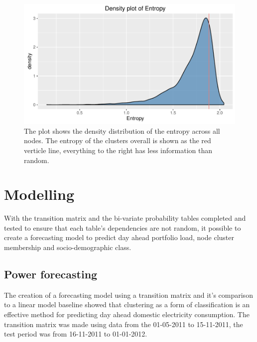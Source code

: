\begin{figure}[ht]
    \centering
    \includegraphics{Figures/Results/stabilitydens}
    \caption[Entropy density]{The plot shows the density distribution of the entropy across all nodes. The entropy of the clusters overall is shown as the red verticle line, everything to the right has less information than random.}
    \label{fig:stabilitydens}
\end{figure}


\FloatBarrier

\section{Modelling}
With the transition matrix and the bi-variate probability tables completed and tested to ensure that each table's dependencies are not random, it possible to create a forecasting model to predict day ahead portfolio load, node cluster membership and socio-demographic class. 

\subsection{Power forecasting}
The creation of a forecasting model using a transition matrix and it's comparison to a linear model baseline showed that clustering as a form of classification is an effective method for predicting day ahead domestic electricity consumption. The transition matrix was made using data from the 01-05-2011 to 15-11-2011, the test period was from 16-11-2011 to 01-01-2012.

